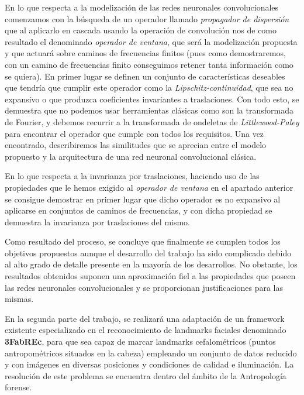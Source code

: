 \medskip

\noindent En lo que respecta a la modelización de las redes neuronales convolucionales comenzamos con la búsqueda de un operador llamado \textit{propagador de dispersión} que al aplicarlo en cascada usando la operación de convolución nos de como resultado el denominado \textit{operador de ventana}, que será la modelización propuesta y que actuará sobre caminos de frecuencias finitos (pues como demostraremos, con un camino de frecuencias finito conseguimos retener tanta información como se quiera). En primer lugar se definen un conjunto de características deseables que tendría que cumplir este operador como la \textit{Lipschitz-continuidad}, que sea no expansivo o que produzca coeficientes invariantes a traslaciones. Con todo esto, se demuestra que no podemos usar herramientas clásicas como son la transformada de Fourier, y debemos recurrir a la transformada de ondeletas de \textit{Littlewood-Paley} para encontrar el operador que cumple con todos los requisitos. Una vez encontrado, describiremos las similitudes que se aprecian entre el modelo propuesto y la arquitectura de una red neuronal convolucional clásica. 

\medskip

\noindent En lo que respecta a la invarianza por traslaciones, haciendo uso de las propiedades que le hemos exigido al \textit{operador de ventana} en el apartado anterior se consigue demostrar en primer lugar que dicho operador es no expansivo al aplicarse en conjuntos de caminos de frecuencias, y con dicha propiedad se demuestra la invarianza por traslaciones del mismo.

\medskip
\noindent Como resultado del proceso, se concluye que finalmente se cumplen todos los objetivos propuestos aunque el desarrollo del trabajo ha sido complicado debido al alto grado de detalle presente en la mayoría de los desarrollos. No obstante, los resultados obtenidos suponen una aproximación fiel a las propiedades que poseen las redes neuronales convolucionales y se proporcionan justificaciones para las mismas.

\medskip

\noindent En la segunda parte del trabajo, se realizará una adaptación de un framework existente especializado en el reconocimiento de landmarks faciales denominado \textbf{3FabREc}, para que sea capaz de marcar landmarks cefalométricos (puntos antropométricos situados en la cabeza) empleando un conjunto de datos reducido y con imágenes en diversas posiciones y condiciones de calidad e iluminación. La resolución de este problema se encuentra dentro del ámbito de la Antropología forense.

